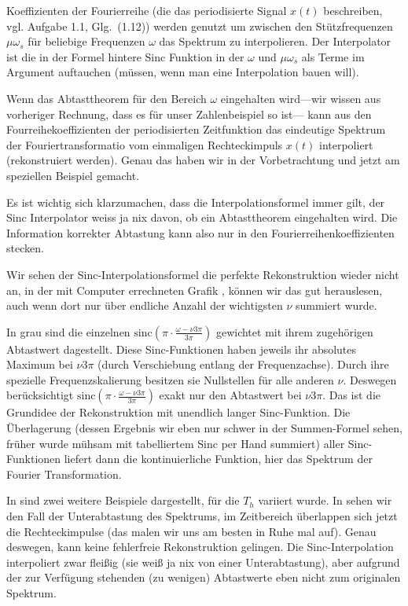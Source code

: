 \begin{Loesung}
Koeffizienten der Fourierreihe (die das periodisierte Signal $x(t)$ beschreiben, vgl. Aufgabe 1.1, Glg.~(1.12))
werden genutzt um zwischen den Stützfrequenzen
$\mu \omega_s$ für beliebige Frequenzen $\omega$ das Spektrum zu interpolieren.
Der Interpolator ist die in der Formel hintere Sinc Funktion in der $\omega$ und
$\mu \omega_s$ als Terme im Argument auftauchen (müssen, wenn man eine Interpolation bauen will).

Wenn das Abtasttheorem für den Bereich $\omega$ eingehalten wird---wir wissen aus
vorheriger Rechnung, dass es für unser Zahlenbeispiel so ist---
kann aus den Fourreihekoeffizienten der periodisierten Zeitfunktion
das eindeutige Spektrum der Fouriertransformatio vom einmaligen Rechteckimpuls $x(t)$
interpoliert (rekonstruiert werden). Genau das haben wir in der Vorbetrachtung und
jetzt am speziellen Beispiel gemacht.

Es ist wichtig sich klarzumachen, dass die Interpolationsformel immer gilt,
der Sinc Interpolator weiss ja nix davon, ob ein Abtasttheorem eingehalten wird.
Die Information korrekter Abtastung kann also nur in den Fourierreihenkoeffizienten stecken.

Wir sehen der Sinc-Interpolationsformel die perfekte Rekonstruktion wieder nicht an,
in der mit Computer errechneten Grafik ,
können wir das gut herauslesen, auch wenn dort nur über endliche Anzahl der
wichtigsten $\nu$ summiert wurde.

In grau sind die einzelnen $\mathrm{sinc}(\pi\cdot\frac{\omega-\nu 3 \pi}{3\pi})$
gewichtet mit ihrem zugehörigen Abtastwert dagestellt.
Diese Sinc-Funktionen haben jeweils ihr absolutes Maximum bei $\nu 3 \pi$ (durch
Verschiebung entlang der Frequenzachse). Durch ihre spezielle Frequenzskalierung
besitzen sie Nullstellen für alle anderen $\nu$. Deswegen
berücksichtigt $\mathrm{sinc}(\pi\cdot\frac{\omega-\nu 3 \pi}{3\pi})$
exakt nur den Abtastwert bei $\nu 3 \pi$. Das ist die Grundidee der Rekonstruktion
mit unendlich langer Sinc-Funktion. Die Überlagerung (dessen Ergebnis wir eben nur schwer
in der Summen-Formel sehen, früher wurde mühsam mit tabelliertem Sinc per Hand summiert)
aller Sinc-Funktionen liefert dann die kontinuierliche Funktion,
hier das Spektrum der Fourier Transformation.



%
In  sind zwei weitere Beispiele
dargestellt, für die $T_h$ variiert wurde.
In  sehen wir den Fall der
Unterabtastung des Spektrums, im Zeitbereich überlappen sich jetzt die
Rechteckimpulse (das malen wir uns am besten in Ruhe mal auf).
Genau deswegen, kann keine fehlerfreie Rekonstruktion gelingen. Die Sinc-Interpolation
interpoliert zwar fleißig (sie weiß ja nix von einer Unterabtastung), aber aufgrund
der zur Verfügung stehenden (zu wenigen) Abtastwerte eben nicht zum originalen Spektrum.
\end{Loesung}


